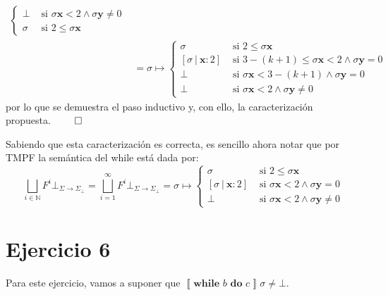 \documentclass{article}
\newcommand{\sem}[1]{\left\llbracket #1\right\rrbracket}
\newcommand{\N}{\mathbb{N}}
\newcommand{\x}{\textbf{x}}
\newcommand{\y}{\textbf{y}}
\newcommand{\supr}{\bigsqcup\limits}
\newcommand{\cdom}{\Sigma \to \Sigma_\bot}
\newcommand{\cfbot}{\bot_{\cdom}}
\newcommand{\cwhile}[2]{\textbf{while }#1\textbf{ do }#2}
\begin{document}
\begin{equation*}
\begin{aligned}
\begin{cases}
                   \bot &\text{ si } \sigma\x < 2 \land \sigma\y \neq 0 \\ 
                   \sigma &\text{ si } 2 \leq \sigma\x
                 \end{cases} \\ 
                 &= \sigma \mapsto \begin{cases}
                   \sigma &\text{ si } 2 \leq \sigma\x \\ 
                   [\sigma\ |\ \x : 2] &\text{ si } 3-(k+1) \leq \sigma\x < 2 \land \sigma\y = 0 \\ 
                   \bot &\text{ si } \sigma\x < 3-(k+1) \land \sigma\y = 0 \\ 
                   \bot &\text{ si } \sigma\x < 2 \land \sigma\y \neq 0
                 \end{cases}
  \end{aligned}
\end{equation*}
por lo que se demuestra el paso inductivo y, con ello, la caracterización propuesta. $\qed$

Sabiendo que esta caracterización es correcta, es sencillo ahora notar que por TMPF la semántica del while está dada por:
\begin{equation*}
  \supr_{i \in \N} F^i \cfbot = \supr_{i = 1}^\infty F^i \cfbot = \sigma \mapsto \begin{cases}
    \sigma &\text{ si } 2 \leq \sigma\x \\ 
    [\sigma\ |\ \x : 2] &\text{ si } \sigma\x < 2 \land \sigma\y = 0 \\ 
    \bot &\text{ si } \sigma\x < 2 \land \sigma\y \neq 0
  \end{cases}
\end{equation*}

\section*{Ejercicio 6}
Para este ejercicio, vamos a suponer que $\sem{\cwhile{b}{c}}\sigma \neq \bot$.
\end{document}
